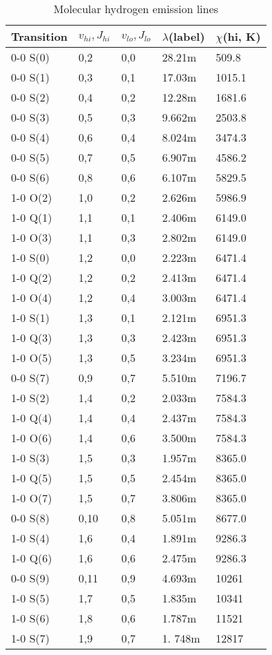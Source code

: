 \begin{table}
\centering
\caption{\label{tab:MolecularHydrogenLines}Molecular hydrogen emission lines}
\begin{tabular}{lllll}
\hline
Transition& $v_{hi},J_{hi}$& $v_{lo},J_{lo}$& $\lambda$(label)& $\chi$(hi,
K)\\
\hline
0-0 S(0)& 0,2& 0,0& 28.21m& 509.8\\
0-0 S(1)& 0,3& 0,1& 17.03m& 1015.1\\
0-0 S(2)& 0,4& 0,2& 12.28m& 1681.6\\
0-0 S(3)& 0,5& 0,3& 9.662m& 2503.8\\
0-0 S(4)& 0,6& 0,4& 8.024m& 3474.3\\
0-0 S(5)& 0,7& 0,5& 6.907m& 4586.2\\
0-0 S(6)& 0,8& 0,6& 6.107m& 5829.5\\
1-0 O(2)& 1,0& 0,2& 2.626m& 5986.9\\
1-0 Q(1)& 1,1& 0,1& 2.406m& 6149.0\\
1-0 O(3)& 1,1& 0,3& 2.802m& 6149.0\\
1-0 S(0)& 1,2& 0,0& 2.223m& 6471.4\\
1-0 Q(2)& 1,2& 0,2& 2.413m& 6471.4\\
1-0 O(4)& 1,2& 0,4& 3.003m& 6471.4\\
1-0 S(1)& 1,3& 0,1& 2.121m& 6951.3\\
1-0 Q(3)& 1,3& 0,3& 2.423m& 6951.3\\
1-0 O(5)& 1,3& 0,5& 3.234m& 6951.3\\
0-0 S(7)& 0,9& 0,7& 5.510m& 7196.7\\
1-0 S(2)& 1,4& 0,2& 2.033m& 7584.3\\
1-0 Q(4)& 1,4& 0,4& 2.437m& 7584.3\\
1-0 O(6)& 1,4& 0,6& 3.500m& 7584.3\\
1-0 S(3)& 1,5& 0,3& 1.957m& 8365.0\\
1-0 Q(5)& 1,5& 0,5& 2.454m& 8365.0\\
1-0 O(7)& 1,5& 0,7& 3.806m& 8365.0\\
0-0 S(8)& 0,10& 0,8& 5.051m& 8677.0\\
1-0 S(4)& 1,6& 0,4& 1.891m& 9286.3\\
1-0 Q(6)& 1,6& 0,6& 2.475m& 9286.3\\
0-0 S(9)& 0,11& 0,9& 4.693m& 10261\\
1-0 S(5)& 1,7& 0,5& 1.835m& 10341\\
1-0 S(6)& 1,8& 0,6& 1.787m& 11521\\
1-0 S(7)& 1,9& 0,7& 1. 748m& 12817\\
\hline
\end{tabular}
\end{table}

